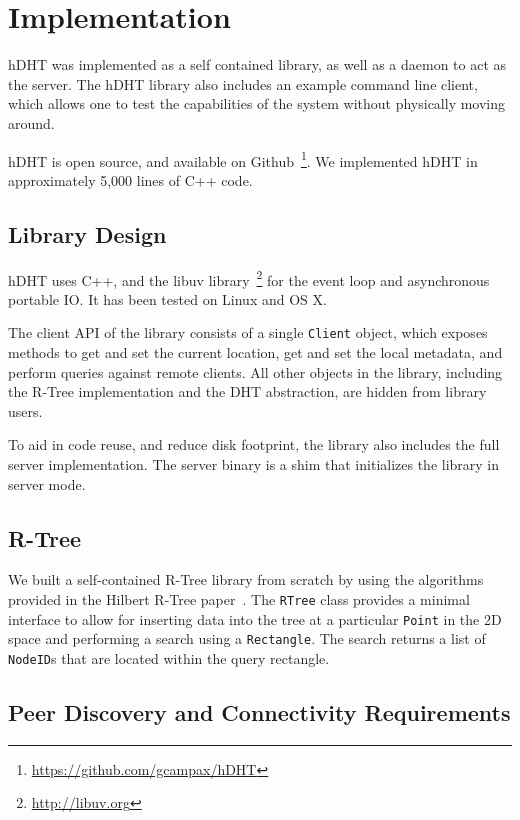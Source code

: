 \section{Implementation} \label{section:implementation}

hDHT was implemented as a self contained library, as well as a daemon to act as the server.
The hDHT library also includes an example command line client, which allows one to test the capabilities of the system without physically moving around.

hDHT is open source, and available on Github~\footnote{\url{https://github.com/gcampax/hDHT}}. We implemented hDHT in approximately 5,000 lines of C++ code.

\subsection{Library Design}

hDHT uses C++, and the libuv library~\footnote{\url{http://libuv.org}} for the event loop and asynchronous portable IO.
It has been tested on Linux and OS X.

The client API of the library consists of a single \texttt{Client} object, which exposes methods to get and set the current location, get and set the local metadata, and perform queries against remote clients.
All other objects in the library, including the R-Tree implementation and the DHT abstraction, are hidden from library users.

To aid in code reuse, and reduce disk footprint, the library also includes the full server implementation. The server binary is a shim that initializes the library in server mode.

\subsection{R-Tree}
We built a self-contained R-Tree library from scratch by using the algorithms provided in the Hilbert R-Tree paper~\cite{kamel1993hilbert}. The \texttt{RTree} class provides a minimal interface to allow for inserting data
into the tree at a particular \texttt{Point} in the 2D space and performing a search using a \texttt{Rectangle}. The search returns a list of \texttt{NodeID}s that are located within the query rectangle.

\subsection{Peer Discovery and Connectivity Requirements}

